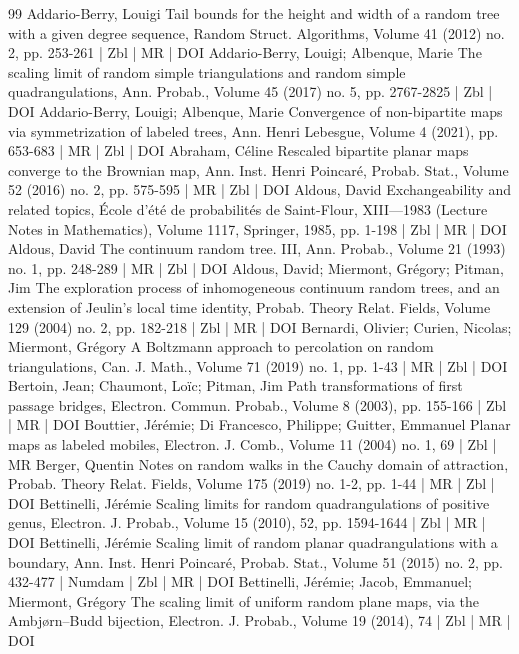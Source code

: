 \begin{thebibliography}{99}
Addario-Berry, Louigi Tail bounds for the height and width of a random tree with a given degree sequence, Random Struct. Algorithms, Volume 41 (2012) no. 2, pp. 253-261 | Zbl | MR | DOI
Addario-Berry, Louigi; Albenque, Marie The scaling limit of random simple triangulations and random simple quadrangulations, Ann. Probab., Volume 45 (2017) no. 5, pp. 2767-2825 | Zbl | DOI
Addario-Berry, Louigi; Albenque, Marie Convergence of non-bipartite maps via symmetrization of labeled trees, Ann. Henri Lebesgue, Volume 4 (2021), pp. 653-683 | MR | Zbl | DOI
Abraham, Céline Rescaled bipartite planar maps converge to the Brownian map, Ann. Inst. Henri Poincaré, Probab. Stat., Volume 52 (2016) no. 2, pp. 575-595 | MR | Zbl | DOI
Aldous, David Exchangeability and related topics, École d’été de probabilités de Saint-Flour, XIII—1983 (Lecture Notes in Mathematics), Volume 1117, Springer, 1985, pp. 1-198 | Zbl | MR | DOI
Aldous, David The continuum random tree. III, Ann. Probab., Volume 21 (1993) no. 1, pp. 248-289 | MR | Zbl | DOI
Aldous, David; Miermont, Grégory; Pitman, Jim The exploration process of inhomogeneous continuum random trees, and an extension of Jeulin’s local time identity, Probab. Theory Relat. Fields, Volume 129 (2004) no. 2, pp. 182-218 | Zbl | MR | DOI
Bernardi, Olivier; Curien, Nicolas; Miermont, Grégory A Boltzmann approach to percolation on random triangulations, Can. J. Math., Volume 71 (2019) no. 1, pp. 1-43 | MR | Zbl | DOI
Bertoin, Jean; Chaumont, Loïc; Pitman, Jim Path transformations of first passage bridges, Electron. Commun. Probab., Volume 8 (2003), pp. 155-166 | Zbl | MR | DOI
Bouttier, Jérémie; Di Francesco, Philippe; Guitter, Emmanuel Planar maps as labeled mobiles, Electron. J. Comb., Volume 11 (2004) no. 1, 69 | Zbl | MR
Berger, Quentin Notes on random walks in the Cauchy domain of attraction, Probab. Theory Relat. Fields, Volume 175 (2019) no. 1-2, pp. 1-44 | MR | Zbl | DOI
Bettinelli, Jérémie Scaling limits for random quadrangulations of positive genus, Electron. J. Probab., Volume 15 (2010), 52, pp. 1594-1644 | Zbl | MR | DOI
Bettinelli, Jérémie Scaling limit of random planar quadrangulations with a boundary, Ann. Inst. Henri Poincaré, Probab. Stat., Volume 51 (2015) no. 2, pp. 432-477 | Numdam | Zbl | MR | DOI
Bettinelli, Jérémie; Jacob, Emmanuel; Miermont, Grégory The scaling limit of uniform random plane maps, via the Ambjørn–Budd bijection, Electron. J. Probab., Volume 19 (2014), 74 | Zbl | MR | DOI

\end{thebibliography}
